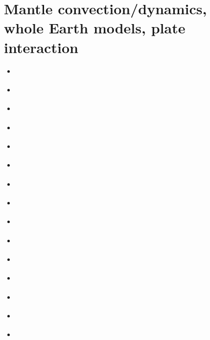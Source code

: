 \section{Mantle convection/dynamics, whole Earth models, plate interaction}

\begin{scriptsize}
\begin{itemize}
\item[\nineteensixtyseven] 
\textcite{tuox67} 
\item[\nineteenseventyone] 
\textcite{totu71} 
\textcite{buwh71} 
\item[\nineteenseventytwo] 
\textcite{pelt72} 
\item[\nineteenseventythree] 
\textcite{mcrw73} 
\item[\nineteenseventyfour] 
\textcite{youn74} 
\textcite{mcrw74} 
\item[\nineteenseventyfive] 
\textcite{hemw75} 
\textcite{buss75} 
\item[\nineteenseventysix] 
\textcite{mcri76} 
\textcite{sath76} 
\item[\nineteenseventyseven] 
\textcite{yusc77} 
\item[\nineteenseventyeight] 
\textcite{mahz78} 
\textcite{hsui78} 
\textcite{haoc78} 
\textcite{pamc78} 
\textcite{rimc78} 
\item[\nineteenseventynine] 
\textcite{ludt79} 
\textcite{buss79} 
\textcite{shpe79} 
\textcite{phiv79} 
\item[\nineteeneighty] 
\textcite{olco80} 
\textcite{jamc80} 
\textcite{scsc80} 
\textcite{zess80} 
\textcite{daly80} 
\item[\nineteeneightyone] 
\textcite{yups81} 
\textcite{buss81} 
\textcite{jasc81} 
\textcite{haoc81} 
\textcite{cotu81} 
\item[\nineteeneightytwo] 
\textcite{jape82} 
\textcite{homc82} 
\textcite{buri82} 
\item[\nineteeneightythree] 
\textcite{hous83} 
\textcite{hous83b} 
\textcite{chri83} 
\textcite{mcke83} 
\textcite{chri83b} 
\textcite{zesd83} 
\item[\nineteeneightyfour] 
\textcite{olyb84} 
\textcite{jarv84} 
\textcite{haeb84} 
\textcite{haeb84b} 
\textcite{harp84} 
\textcite{davi84} 
\textcite{boas84} 

\end{itemize}
\end{scriptsize}

